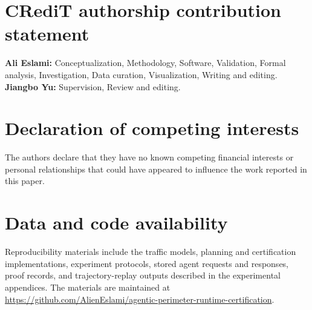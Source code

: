 \section*{CRediT authorship contribution statement}
\textbf{Ali Eslami:} Conceptualization, Methodology, Software, Validation,
Formal analysis, Investigation, Data curation, Visualization,
Writing and editing.
\textbf{Jiangbo Yu:} Supervision, Review and editing.

\section*{Declaration of competing interests}
The authors declare that they have no known competing financial interests or
personal relationships that could have appeared to influence the work
reported in this paper.

\section*{Data and code availability}
Reproducibility materials include the traffic models, planning and
certification implementations, experiment protocols, stored agent requests
and responses, proof records, and trajectory-replay outputs described in the
experimental appendices. The materials are maintained at
\url{https://github.com/AlienEslami/agentic-perimeter-runtime-certification}.
